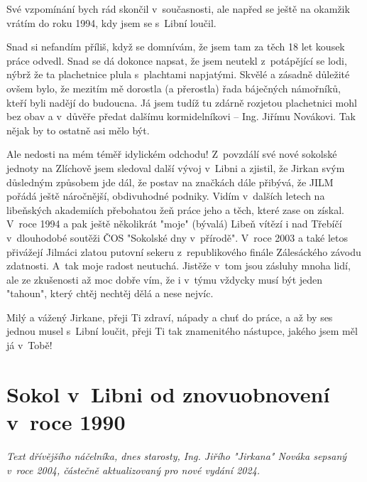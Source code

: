 \documentclass[a5paper, 11pt, twoside]{article}
\begin{document}
Své vzpomínání bych rád skončil v~současnosti, ale napřed se ještě na
okamžik vrátím do roku 1994, kdy jsem se s~Libní loučil.

Snad si nefandím příliš, když se domnívám, že jsem tam za těch 18 let
kousek práce odvedl. Snad se dá dokonce napsat, že jsem neutekl
z~potápějící se lodi, nýbrž že ta plachetnice plula s~plachtami napjatými.
Skvělé a zásadně důležité ovšem bylo, že mezitím mě dorostla (a
přerostla) řada báječných námořníků, kteří byli nadějí do budoucna. Já
jsem tudíž tu zdárně rozjetou plachetnici mohl bez obav a v~důvěře
předat dalšímu kormidelníkovi -- Ing. Jiřímu Novákovi. Tak nějak by to
ostatně asi mělo být.

Ale nedosti na mém téměř idylickém odchodu! Z~povzdálí své nové sokolské
jednoty na Zlíchově jsem sledoval další vývoj v~Libni a zjistil, že
Jirkan svým důsledným způsobem jde dál, že postav na značkách dále
přibývá, že JILM pořádá ještě náročnější, obdivuhodné podniky. Vidím
v~dalších letech na libeňských akademiích přebohatou žeň práce jeho a
těch, které zase on získal. V~roce 1994 a pak ještě několikrát "moje"
(bývalá) Libeň vítězí i nad Třebíčí v~dlouhodobé soutěži ČOS "Sokolské
dny v~přírodě". V~roce 2003 a také letos přivážejí Jilmáci zlatou
putovní sekeru z~republikového finále Zálesáckého závodu zdatnosti.
A~tak moje radost neutuchá. Jistěže v~tom jsou zásluhy mnoha lidí, ale ze
zkušenosti až moc dobře vím, že i v~týmu vždycky musí být jeden
"tahoun", který chtěj nechtěj dělá a nese nejvíc.

Milý a vážený Jirkane, přeji Ti zdraví, nápady a chuť do práce, a až by
ses jednou musel s~Libní loučit, přeji Ti tak znamenitého nástupce,
jakého jsem měl já v~Tobě!

\section{Sokol v~Libni od znovuobnovení v~roce 1990}

\begin{center}
  \textit{Text dřívějšího náčelníka, dnes starosty, Ing. Jiřího "Jirkana"
  Nováka sepsaný v~roce 2004, částečně aktualizovaný pro nové vydání
  2024.}
\end{center}
\end{document}
